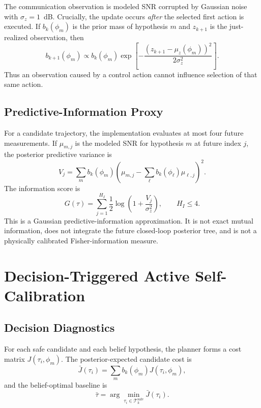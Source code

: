 \documentclass[journal]{IEEEtran}
\begin{document}
The communication observation is modeled SNR corrupted by Gaussian noise with $\sigma_z=1$~dB. Crucially, the update occurs \emph{after} the selected first action is executed. If $b_k(\phi_m)$ is the prior mass of hypothesis $m$ and $z_{k+1}$ is the just-realized observation, then
\begin{equation}
b_{k+1}(\phi_m)
\propto
b_k(\phi_m)
\exp\!\left[
-\frac{(z_{k+1}-\mu_z(\phi_m))^2}{2\sigma_z^2}
\right].
\end{equation}
Thus an observation caused by a control action cannot influence selection of that same action.

\subsection{Predictive-Information Proxy}
For a candidate trajectory, the implementation evaluates at most four future measurements. If $\mu_{m,j}$ is the modeled SNR for hypothesis $m$ at future index $j$, the posterior predictive variance is
\begin{equation}
V_j=\sum_m b_k(\phi_m)
\left(\mu_{m,j}-\sum_\ell b_k(\phi_\ell)\mu_{\ell,j}\right)^2.
\end{equation}
The information score is
\begin{equation}
G(\tau)
=
\sum_{j=1}^{H_I}
\frac{1}{2}\log\!\left(1+\frac{V_j}{\sigma_z^2}\right),
\qquad H_I\le 4.
\end{equation}
This is a Gaussian predictive-information approximation. It is not exact mutual information, does not integrate the future closed-loop posterior tree, and is not a physically calibrated Fisher-information measure.

\section{Decision-Triggered Active Self-Calibration}
\subsection{Decision Diagnostics}
For each safe candidate and each belief hypothesis, the planner forms a cost matrix $J(\tau_i,\phi_m)$. The posterior-expected candidate cost is
\begin{equation}
\bar J(\tau_i)=\sum_m b_k(\phi_m)J(\tau_i,\phi_m),
\end{equation}
and the belief-optimal baseline is
\begin{equation}
\bar\tau=\arg\min_{\tau_i\in\mathcal{T}^{\mathrm{safe}}_k}\bar J(\tau_i).
\end{equation}
\end{document}
